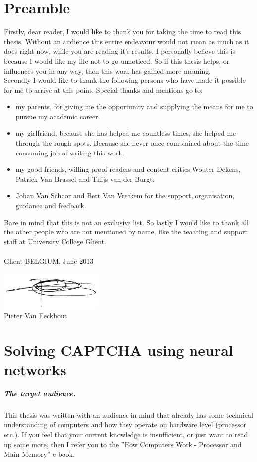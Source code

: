 \documentclass[pdftex,a4paper,12pt,twoside]{report}
\newcommand{\studenta}{Pieter {Van Eeckhout}}
\begin{document}
\chapter*{Preamble}
\label{ch:preamble}
Firstly, dear reader, I would like to thank you for taking the time to read this thesis. Without an audience this entire endeavour would not mean as much as it does right now, while you are reading it's results. I personally believe this is because I would like my life not to go unnoticed. So if this thesis helps, or influences you in any way, then this work has gained more meaning.\\Secondly I would like to thank the following persons who have made it possible for me to arrive at this point. Special thanks and mentions go to:
\begin{itemize}
\item my parents, for giving me the opportunity and supplying the means for me to pursue my academic career.
\item my girlfriend, because she has helped me countless times, she helped me through the rough spots. Because she never once complained about the time consuming job of writing this work.
\item my good friends, willing proof readers and content critics Wouter Dekens, Patrick Van Brussel and Thijs van der Burgt.
\item Johan Van Schoor and Bert Van Vreckem for the support, organisation, guidance and feedback.
\end{itemize}
Bare in mind that this is not an exclusive list. So lastly I would like to thank all the other people who are not mentioned by name, like the teaching and support staff at University College Ghent.\\\\Ghent BELGIUM, June 2013
\begin{center}
\includegraphics[width=5cm]{./img/signature.png}\\[.5cm]
\studenta
\end{center}
\chapter{Solving CAPTCHA using neural networks}
\label{ch:introduction}
\paragraph{The target audience.}
This thesis was written with an audience in mind that already has some technical understanding of computers and how they operate on hardware level (processor etc.). If you feel that your current knowledge is insufficient, or just want to read up some more, then I refer you to the ''How Computers Work - Processor and Main Memory'' \citep{Young2001} e-book.
\end{document}
